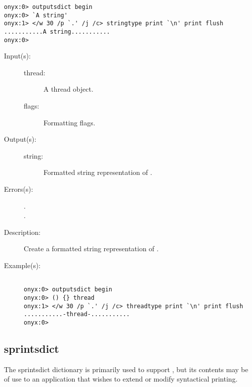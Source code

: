 \begin{description}
\begin{description}
\begin{verbatim}
onyx:0> outputsdict begin
onyx:0> `A string'
onyx:1> </w 30 /p `.' /j /c> stringtype print `\n' print flush
...........A string...........
onyx:0>
		\end{verbatim}
	\end{description}
\label{outputsdict:threadtype}
\item[{\onyxop{thread flags}{threadtype}{string}}: ]
	\begin{description}\item[]
	\item[Input(s): ]
		\begin{description}\item[]
		\item[thread: ]
			A thread object.
		\item[flags: ]
			Formatting flags.
		\end{description}
	\item[Output(s): ]
		\begin{description}\item[]
		\item[string: ]
			Formatted string representation of .
		\end{description}
	\item[Errors(s): ]
		\begin{description}\item[]
		\item[.]
		\item[.]
		\end{description}
	\item[Description: ]
		Create a formatted string representation of .
	\item[Example(s): ]\begin{verbatim}

onyx:0> outputsdict begin
onyx:0> () {} thread
onyx:1> </w 30 /p `.' /j /c> threadtype print `\n' print flush
...........-thread-...........
onyx:0>
		\end{verbatim}
	\end{description}
\end{description}

\subsection{sprintsdict}
\label{sec:sprintsdict}

The sprintsdict dictionary is primarily used to support
, but its contents may be of
use to an application that wishes to extend or modify syntactical printing.

